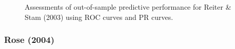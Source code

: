 \begin{figure}
	\centering   
	\caption{Assessments of out-of-sample predictive performance for Reiter \& Stam (2003) using ROC curves and PR curves.}
\end{figure}
\FloatBarrier

\clearpage
\subsubsection*{Rose (2004)}



\FloatBarrier

\FloatBarrier

